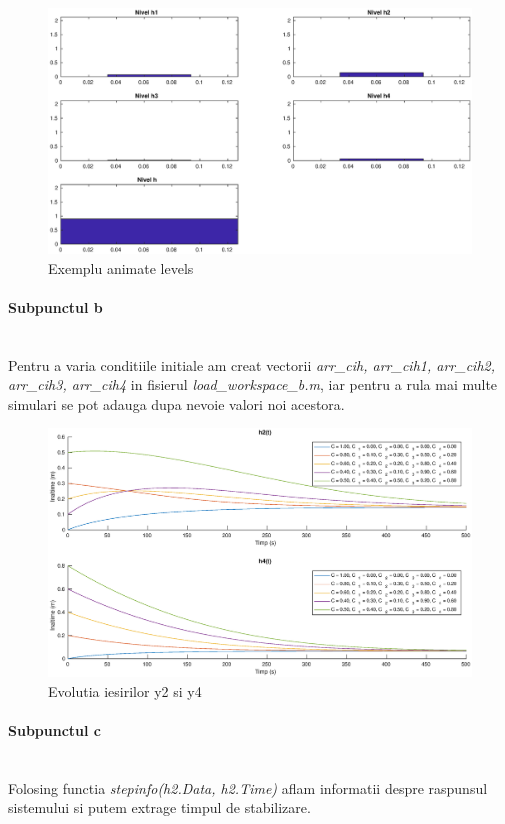 \documentclass[12pt,english]{article}
\newcommand{\myparagraph}[1]{\paragraph{#1}\mbox{}\\}
\begin{document}
\begin{figure} [H]
	\includegraphics[width=1\textwidth]{a_1.eps}
	\caption{Exemplu animate levels}
\end{figure}

\myparagraph {Subpunctul b}
Pentru a varia conditiile initiale am creat vectorii \textit{arr\_cih, arr\_cih1, arr\_cih2, arr\_cih3, arr\_cih4} in fisierul \textit{load\_workspace\_b.m}, iar pentru a rula mai multe simulari se pot adauga dupa nevoie valori noi acestora.

\begin{figure} [H]
	\includegraphics[width=1\textwidth]{b_1.eps}
	\caption{Evolutia iesirilor y2 si y4}
\end{figure}


\pagebreak
\myparagraph {Subpunctul c}
Folosing functia \textit{stepinfo(h2.Data, h2.Time)} aflam informatii despre raspunsul sistemului si putem extrage timpul de stabilizare.
\end{document}

